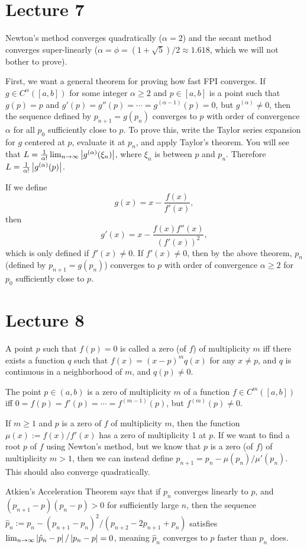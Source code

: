 \documentclass{article}
\begin{document}
\section{Lecture 7}
Newton's method converges quadratically ($\alpha = 2$) and the secant method converges super-linearly ($\alpha =\phi = (1 + \sqrt{5})/2 \approx 1.618$, which we will not bother to prove).
\par
First, we want a general theorem for proving how fast FPI converges. If $g \in C^\alpha([a,b])$ for some integer $\alpha \geq 2$ and $p \in [a,b]$ is a point such that $g(p)=p$ and $g'(p)=g''(p)=\cdots = g^{(\alpha-1)}(p)=0$, but $g^{(\alpha)} \neq 0$, then the sequence defined by $p_{n+1}=g(p_n)$ converges to $p$ with order of convergence $\alpha$ for all $p_0$ sufficiently close to $p$. To prove this, write the Taylor series expansion for $g$ centered at $p$, evaluate it at $p_n$, and apply Taylor's theorem. You will see that $L = \frac{1}{\alpha!} \lim_{n \rightarrow \infty} \left\lvert g^{(\alpha)}(\xi_n) \right\rvert$, where $\xi_n$ is between $p$ and $p_n$. Therefore $L = \frac{1}{\alpha!} \left\lvert g^{(\alpha)} (p) \right\rvert$.
\par
If we define
\[ g(x) = x - \frac{f(x)}{f'(x)}, \]
then
\[ g'(x) = x - \frac{f(x)f''(x)}{(f'(x))^2}, \]
which is only defined if $f'(x) \neq 0$. If $f'(x) \neq 0$, then by the above theorem, $p_n$ (defined by $p_{n+1} = g(p_n)$) converges to $p$ with order of convergence $\alpha \geq 2$ for $p_0$ sufficiently close to $p$.

\section{Lecture 8}
A point $p$ such that $f(p)=0$ is called a zero (of $f$) of multiplicity $m$ iff there exists a function $q$ such that $f(x) = (x-p)^m q(x)$ for any $x \neq p$, and $q$ is continuous in a neighborhood of $m$, and $q(p) \neq 0$.
\par
The point $p \in (a,b)$ is a zero of multiplicity $m$ of a function $f \in C^m([a,b])$ iff $0 = f(p) = f'(p) = \cdots = f^{(m-1)}(p)$, but $f^{(m)}(p) \neq 0$.
\par
If $m \geq 1$ and $p$ is a zero of $f$ of multiplicity $m$, then the function $\mu(x) := f(x)/f'(x)$ has a zero of multiplicity 1 at $p$. If we want to find a root $p$ of $f$ using Newton's method, but we know that $p$ is a zero (of $f$) of multiplicity $m > 1$, then we can instead define $p_{n+1} = p_n - \mu(p_n)/\mu'(p_n)$. This should also converge quadratically.
\par
Atkien's Acceleration Theorem says that if $p_n$ converges linearly to $p$, and $(p_{n+1}-p)(p_n-p)>0$ for sufficiently large $n$, then the sequence $\hat{p}_n := p_n - (p_{n+1}-p_n)^2/(p_{n+2}-2p_{n+1}+p_n)$ satisfies $\lim_{n \rightarrow \infty} \left\lvert \hat{p}_n-p \right\rvert/\left\lvert p_n-p \right\rvert = 0$, meaning $\hat{p}_n$ converges to $p$ faster than $p_n$ does.
\end{document}
